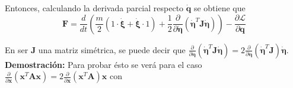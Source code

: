 \documentclass[twoside,11pt]{book}
\begin{document}
Entonces, calculando la derivada parcial respecto $\pmb{\dot{q}}$ se obtiene que 
\begin{equation}
\pmb{F}=\frac{d}{dt}\left(\frac{m}{2}(1\cdot \pmb{ \dot{\xi}}+\pmb{\dot{\xi}}\cdot 1)+\frac{1}{2}\frac{\partial}{\partial \pmb{\dot{\eta}}}(\pmb{\dot{\eta}}^{T}\pmb{J}\pmb{\dot{\eta}})\right)-\frac{\partial \mathcal{L}}{\partial \pmb{q}}
\end{equation}

En ser $\pmb{J}$ una matriz simétrica, se puede decir que  $\frac{\partial}{\partial \pmb{\dot{\eta}}}(\pmb{\dot{\eta}}^{T}\pmb{J}\pmb{\dot{\eta}})=2 \frac{\partial}{\partial \pmb{\dot{\eta}}}(\pmb{\dot{\eta}}^{T}\pmb{J})\pmb{\dot{\eta}} $. \\

\textbf{Demostración:} Para probar ésto se verá para el caso $\frac{\partial}{\partial \pmb{x}}(\pmb{x}^{T}\pmb{A}\pmb{x})=2 \frac{\partial}{\partial \pmb{x}}(\pmb{x}^{T}\pmb{A})\pmb{x} $ con 
\end{document}
